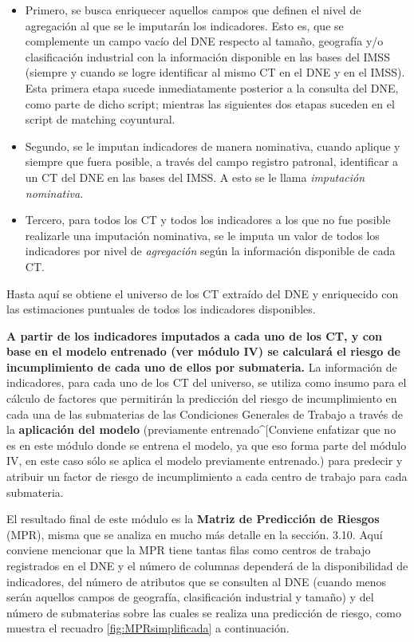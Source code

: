 \documentclass[
]{article}
\begin{document}
\begin{itemize}
\item
  Primero, se busca enriquecer aquellos campos que definen el nivel de agregación al que se le imputarán los indicadores. Esto es, que se complemente un campo vacío del DNE respecto al tamaño, geografía y/o clasificación industrial con la información disponible en las bases del IMSS (siempre y cuando se logre identificar al mismo CT en el DNE y en el IMSS). Esta primera etapa sucede inmediatamente posterior a la consulta del DNE, como parte de dicho script; mientras las siguientes dos etapas suceden en el script de matching coyuntural.
\item
  Segundo, se le imputan indicadores de manera nominativa, cuando aplique y siempre que fuera posible, a través del campo registro patronal, identificar a un CT del DNE en las bases del IMSS. A esto se le llama \emph{imputación nominativa}.
\item
  Tercero, para todos los CT y todos los indicadores a los que no fue posible realizarle una imputación nominativa, se le imputa un valor de todos los indicadores por nivel de \emph{agregación} según la información disponible de cada CT.
\end{itemize}

Hasta aquí se obtiene el universo de los CT extraído del DNE y enriquecido con las estimaciones puntuales de todos los indicadores disponibles.

\textbf{A partir de los indicadores imputados a cada uno de los CT, y con base en el modelo entrenado (ver módulo IV) se calculará el riesgo de incumplimiento de cada uno de ellos por submateria.} La información de indicadores, para cada uno de los CT del universo, se utiliza como insumo para el cálculo de factores que permitirán la predicción del riesgo de incumplimiento en cada una de las submaterias de las Condiciones Generales de Trabajo a través de la \textbf{aplicación del modelo} (previamente entrenado\^{}{[}Conviene enfatizar que no es en este módulo donde se entrena el modelo, ya que eso forma parte del módulo IV, en este caso sólo se aplica el modelo previamente entrenado.) para predecir y atribuir un factor de riesgo de incumplimiento a cada centro de trabajo para cada submateria.

El resultado final de este módulo es la \textbf{Matriz de Predicción de Riesgos} (MPR), misma que se analiza en mucho más detalle en la sección. 3.10. Aquí conviene mencionar que la MPR tiene tantas filas como centros de trabajo registrados en el DNE y el número de columnas dependerá de la disponibilidad de indicadores, del número de atributos que se consulten al DNE (cuando menos serán aquellos campos de geografía, clasificación industrial y tamaño) y del número de submaterias sobre las cuales se realiza una predicción de riesgo, como muestra el recuadro \ref{fig:MPRsimplificada} a continuación.
\end{document}
